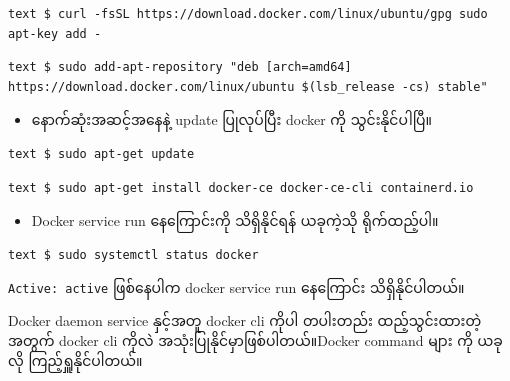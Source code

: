 \documentclass{article}
\begin{document}
\texttt{text   \$ curl -fsSL https://download.docker.com/linux/ubuntu/gpg \textbar{} sudo apt-key add -}

\texttt{text   \$ sudo add-apt-repository "deb {[}arch=amd64{]} https://download.docker.com/linux/ubuntu \$(lsb\_release -cs) stable"}

\begin{itemize}
\itemsep1pt\parskip0pt
\item
  နောက်ဆုံးအဆင့်အနေနဲ့ update ပြုလုပ်ပြီး docker ကို သွင်းနိုင်ပါပြီ။
\end{itemize}

\texttt{text   \$ sudo apt-get update}

\texttt{text   \$ sudo apt-get install docker-ce docker-ce-cli containerd.io}

\begin{itemize}
\itemsep1pt\parskip0pt
\item
  Docker service run နေကြောင်းကို သိရှိနိုင်ရန် ယခုကဲ့သို ရိုက်ထည့်ပါ။
\end{itemize}

\texttt{text   \$ sudo systemctl status docker}

\texttt{Active: active} ဖြစ်နေပါက docker service run နေကြောင်း
သိရှိနိုင်ပါတယ်။

Docker daemon service နှင့်အတူ docker cli ကိုပါ တပါးတည်း ထည့်သွင်းထားတဲ့
အတွက် docker cli ကိုလဲ အသုံးပြုနိုင်မှာဖြစ်ပါတယ်။Docker command များ ကို
ယခုလို ကြည့်ရှူနိုင်ပါတယ်။
\end{document}
